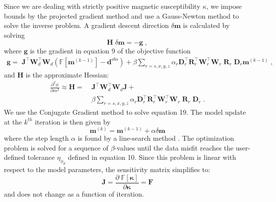 \documentclass[paper]{geophysics}
\begin{document}
Since we are dealing with strictly positive magnetic susceptibility $\kappa$, we impose bounds by the projected gradient method \cite[~p.~157]{Vogel02} and use a Gauss-Newton method to solve the inverse problem.
A gradient descent direction $\delta \mathbf{m}$ is calculated by solving
\begin{equation}\label{GaussNewtStep}
\mathbf{H}\; \delta \mathbf{m} = -\mathbf{g}\;,
\end{equation}
where $\mathbf{g}$ is the gradient in equation 9 of the objective function
\begin{equation}\label{grad}
\begin{split}
\mathbf{g} =\; \mathbf{J}^\top \mathbf{W}_d^\top \mathbf{W}_d \left( \mathbb{F}[\mathbf{m}^{(k-1)}] - \mathbf{d}^{obs}\right)+
\beta \sum_{r = s,x,y,z} \alpha_r \mathbf{D}_r^\top \mathbf{R}_r^\top \mathbf{W}_r^\top \mathbf{W}_r \;\mathbf{R}_r \; \mathbf{D}_r \mathbf{m}^{(k-1)}\;,
\end{split}
\end{equation}
and $\mathbf{H}$ is the approximate Hessian:
\begin{equation}\label{Hessian}
\begin{split}
\frac{\partial^2 \phi}{\partial m^2} \approx \mathbf{H} =\;& \mathbf{J}^\top \mathbf{W}_d^\top \mathbf{W}_d \mathbf{J} + \\
& \beta \sum_{r = s,x,y,z} \alpha_r \mathbf{D}_r^\top \mathbf{R}_r^\top \mathbf{W}_r^\top \mathbf{W}_r \;\mathbf{R}_r \; \mathbf{D}_r \;.
\end{split}
\end{equation}
We use the Conjugate Gradient method \cite[]{HestenesStiefel1952} to solve equation 19.
The model update at the $k^{th}$ iteration is then given by
\begin{equation}
\mathbf{m}^{(k)} = \mathbf{m}^{(k-1)} + \alpha \delta \mathbf{m}
\end{equation}
where the step length $\alpha$ is found by a line-search method \cite[~p.~30]{NocedalWright99}.
The optimization problem is solved for a sequence of $\beta$-values until the data misfit reaches the user-defined tolerance $\eta_{\phi_d}$ defined in equation 10.
Since this problem is linear with respect to the model parameters, the sensitivity matrix simplifies to:
\begin{equation}
\mathbf{J} = \frac{\partial \; \mathbb{F}[\boldsymbol{\kappa}]}{\partial \boldsymbol{\kappa}} = \mathbf{F}
\end{equation}
and does not change as a function of iteration.
\end{document}
